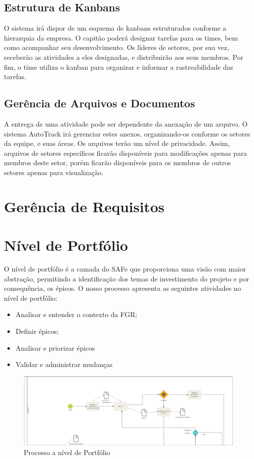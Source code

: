 \subsection{Estrutura de Kanbans}
O sistema irá dispor de um esquema de kanbans estruturados conforme a hierarquia da empresa. O capitão poderá designar tarefas para os times,
bem como acompanhar seu desenvolvimento. Os líderes de setores, por sua vez, receberão as atividades a eles designadas,
 e distribuirão aos seus membros. Por fim, o time utiliza o kanban para organizar e informar a rastreabilidade das tarefas.

\subsection{Gerência de Arquivos e Documentos}
A entrega de uma atividade pode ser dependente da anexação de um arquivo. O sistema AutoTrack irá
gerenciar estes anexos, organizando-os conforme os setores da equipe, e suas áreas. Os arquivos terão um nível de privacidade.
 Assim, arquivos de setores específicos ficarão disponíveis para modificações apenas para membros deste setor, porém
  ficarão disponíveis para os membros de outros setores apenas para visualização.

\section{Gerência de Requisitos}
\section{Nível de Portfólio}
O nível de portfólio é a camada do SAFe que proporciona uma visão com maior abstração, permitindo a identificação dos temas de investimento
do projeto e por consequência, os épicos. O nosso processo apresenta as seguintes atividades no nível de portfólio:

\begin{itemize}
  \item Analisar e entender o contexto da FGR;
  \item Definir épicos;
  \item Analisar e priorizar épicos
  \item Validar e administrar mudanças
\end{itemize}

\pagebreak

\begin{figure}[!h]
        \centering
        \includegraphics[keepaspectratio=true,scale=0.42]{figuras/prog.eps}
        \caption{Processo a nível de Portfólio}
\end{figure}


